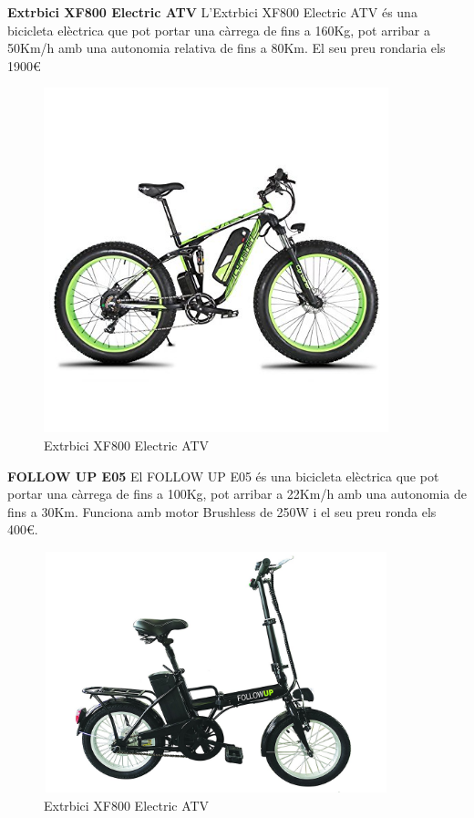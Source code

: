 \textbf{Extrbici XF800 Electric ATV } \bigskip	\newline	%
L'Extrbici XF800 Electric ATV és una bicicleta elèctrica que pot portar una càrrega de fins a 160Kg, pot arribar a 50Km/h amb una autonomia relativa de fins a 80Km. El seu preu rondaria els 1900€
\begin{figure}[H]
		\centering
    	\includegraphics[width=10cm, height=10cm]{Marcteoric/extrbicixf800electricatv.jpg}
     	\caption{Extrbici XF800 Electric ATV}
\end{figure}
\textbf{FOLLOW UP E05 }	\bigskip \newline			%
El FOLLOW UP E05 és una bicicleta elèctrica que pot portar una càrrega de fins a 100Kg, pot arribar a 22Km/h amb una autonomia de fins a 30Km. Funciona amb motor Brushless de 250W i el seu preu ronda els 400€.
\begin{figure}[H]
		\centering
    	\includegraphics[width=10cm, height=7cm]{Marcteoric/followupe05.jpg}
     	\caption{Extrbici XF800 Electric ATV}
\end{figure}

